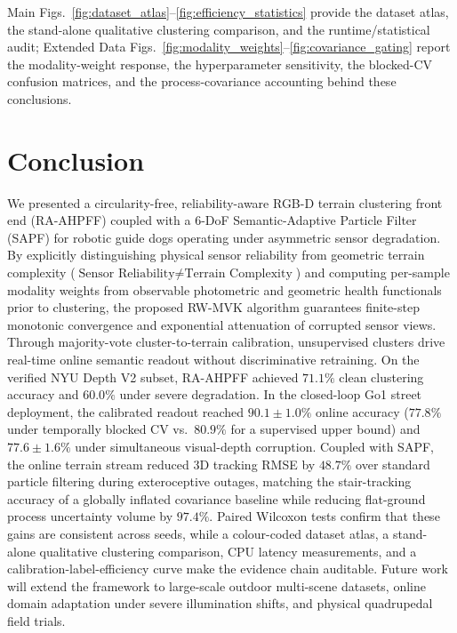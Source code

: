 \documentclass[11pt, a4paper]{article}
\begin{document}
Main Figs.~\ref{fig:dataset_atlas}--\ref{fig:efficiency_statistics} provide the dataset atlas, the stand-alone qualitative clustering comparison, and the runtime/statistical audit; Extended Data Figs.~\ref{fig:modality_weights}--\ref{fig:covariance_gating} report the modality-weight response, the hyperparameter sensitivity, the blocked-CV confusion matrices, and the process-covariance accounting behind these conclusions.

\section{Conclusion}
\label{sec:conclusion}
We presented a circularity-free, reliability-aware RGB-D terrain clustering front end (RA-AHPFF) coupled with a 6-DoF Semantic-Adaptive Particle Filter (SAPF) for robotic guide dogs operating under asymmetric sensor degradation. By explicitly distinguishing physical sensor reliability from geometric terrain complexity ($\text{Sensor Reliability} \neq \text{Terrain Complexity}$) and computing per-sample modality weights from observable photometric and geometric health functionals prior to clustering, the proposed RW-MVK algorithm guarantees finite-step monotonic convergence and exponential attenuation of corrupted sensor views. Through majority-vote cluster-to-terrain calibration, unsupervised clusters drive real-time online semantic readout without discriminative retraining. On the verified NYU Depth V2 subset, RA-AHPFF achieved $71.1\%$ clean clustering accuracy and $60.0\%$ under severe degradation. In the closed-loop Go1 street deployment, the calibrated readout reached $90.1\pm1.0\%$ online accuracy ($77.8\%$ under temporally blocked CV vs.\ $80.9\%$ for a supervised upper bound) and $77.6\pm1.6\%$ under simultaneous visual-depth corruption. Coupled with SAPF, the online terrain stream reduced 3D tracking RMSE by $48.7\%$ over standard particle filtering during exteroceptive outages, matching the stair-tracking accuracy of a globally inflated covariance baseline while reducing flat-ground process uncertainty volume by $97.4\%$. Paired Wilcoxon tests confirm that these gains are consistent across seeds, while a colour-coded dataset atlas, a stand-alone qualitative clustering comparison, CPU latency measurements, and a calibration-label-efficiency curve make the evidence chain auditable. Future work will extend the framework to large-scale outdoor multi-scene datasets, online domain adaptation under severe illumination shifts, and physical quadrupedal field trials.
\end{document}
